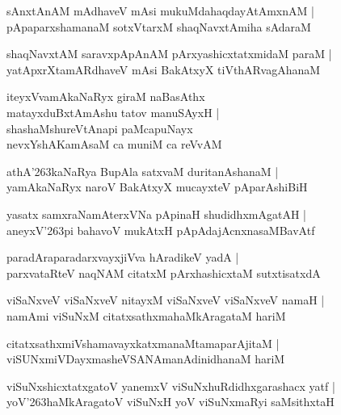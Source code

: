 \documentclass[twoside,12pt,openright]{book}
\def\S{\char'263}
\newcounter{shloka}[chapter]
\begin{document}
\begin{shloka}%
sAnxtAnAM mAdhaveV mAsi mukuMdahaqdayAtAmxnAM |\\
pApaparxshamanaM sotxVtarxM shaqNavxtAmiha sAdaraM 
\end{shloka}

\begin{shloka}%
shaqNavxtAM saravxpApAnAM pArxyashicxtatxmidaM paraM |\\
yatApxrXtamARdhaveV mAsi BakAtxyX tiVthARvagAhanaM 
\end{shloka}

\begin{shloka}%
iteyxVvamAkaNaRyx giraM naBasAthx \\
matayxduBxtAmAshu tatov manuSAyxH |\\
shashaMshureVtAnapi paMcapuNayx\\
nevxYshAKamAsaM ca muniM ca reVvAM 
\end{shloka}

\begin{shloka}%
athA\S kaNaRya BupAla satxvaM duritanAshanaM |\\
yamAkaNaRyx naroV BakAtxyX mucayxteV pAparAshiBiH 
\end{shloka}

\begin{shloka}%
yasatx samxraNamAterxVNa pApinaH shudidhxmAgatAH |\\
aneyxV\S pi bahavoV mukAtxH pApAdajAcnxnasaMBavAtf
\end{shloka}

\begin{shloka}%
paradAraparadarxvayxjiVva hAradikeV yadA |\\
parxvataRteV naqNAM citatxM pArxhashicxtaM sutxtisatxdA 
\end{shloka}

\begin{shloka}%
viSaNxveV viSaNxveV nitayxM viSaNxveV viSaNxveV namaH |\\
namAmi viSuNxM citatxsathxmahaMkAragataM hariM
\end{shloka}

\begin{shloka}%
citatxsathxmiVshamavayxkatxmanaMtamaparAjitaM |\\
viSUNxmiVDayxmasheVSANAmanAdinidhanaM hariM 
\end{shloka}

\begin{shloka}%
viSuNxshicxtatxgatoV yanemxV viSuNxhuRdidhxgarashacx yatf |\\
yoV\S haMkAragatoV viSuNxH yoV viSuNxmaRyi saMsithxtaH 
\end{shloka}
\end{document}
